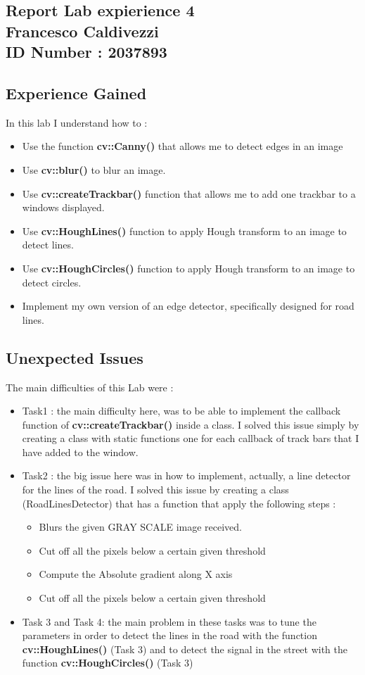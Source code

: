 \documentclass{article}
\begin{document}
\begin{flushleft}
\section*{Report Lab expierience 4\\ Francesco Caldivezzi \\ ID Number : 2037893}

\subsection*{Experience Gained}
In this lab I understand how to :
\begin{itemize}
  \item Use the function \textbf{cv::Canny()} that allows me to detect edges in an image 
  \item Use \textbf{cv::blur()} to blur an image.
  \item Use \textbf{cv::createTrackbar()} function that allows me to add one trackbar to a windows displayed.
  \item Use \textbf{cv::HoughLines()} function to apply Hough transform to an image to detect lines.
  \item Use \textbf{cv::HoughCircles()} function to apply Hough transform to an image to detect circles.
  \item Implement my own version of an edge detector, specifically designed for road lines.
\end{itemize}

\newpage
\subsection*{Unexpected Issues}
The main difficulties of this Lab were :
\begin{itemize}
  \item Task1 : the main difficulty here, was to be able to implement the callback function of \textbf{cv::createTrackbar()} inside a class. I solved this issue simply by creating a class with static functions one for each callback of track bars that I have added to the window.
  \item Task2 : the big issue here was in how to implement, actually, a line detector for the lines of the road. I solved this issue by creating a class (RoadLinesDetector) that has a function that apply the following steps :
    \begin{itemize}
        \item Blurs the given GRAY SCALE image received.
        \item Cut off all the pixels below a certain given threshold
        \item Compute the Absolute gradient along X axis
        \item Cut off all the pixels below a certain given threshold
    \end{itemize}
  \item Task 3 and Task 4: the main problem in these tasks was to tune the parameters in order to detect the lines in the road with the function \textbf{cv::HoughLines()} (Task 3) and to detect the signal in the street with the function \textbf{cv::HoughCircles()} (Task 3)
  

\end{itemize}
\end{flushleft}
\end{document}
